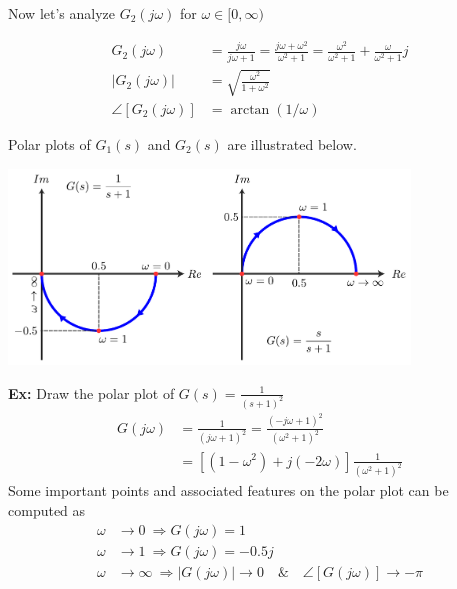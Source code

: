 \documentclass{article}
\begin{document}
Now let's analyze $G_2(j \omega)$ for $\omega \in [0 , \infty)$

\begin{align*}
 G_2(j \omega) &= \frac{j \omega}{j \omega +1} = \frac{j \omega + \omega^2}{\omega^2 +1} 
= \frac{\omega^2}{\omega^2 +1} + \frac{\omega}{\omega^2 +1} j
\\
| G_2(j \omega) | &= \sqrt{ \frac{ \omega^2 }{ 1 + \omega^2 } }
\\
\angle [ G_2(j \omega) ] &= \arctan (1 / \omega) 
\end{align*}

Polar plots of $G_1(s)$ and $G_2(s)$ are illustrated below. 

\vspace{6 pt}

  \begin{minipage}[h]{1\linewidth}
    \begin{center}
      \includegraphics[width=0.8\textwidth]{polar2}
    \end{center}
  \end{minipage}

\vspace{6 pt}

\textbf{Ex:} Draw the polar plot of  $G(s) = \frac{1}{(s+1)^2}$
%
\begin{align*}
  G(j \omega ) &= \frac{1}{ (j \omega + 1)^2 } = \frac{ (-j \omega + 1)^2 }{( \omega^2 +1 )^2 }
\\
&= \left[ \left( 1 - \omega^2 \right) + j ( - 2 \omega) \right] \frac{1}{( \omega^2 +1 )^2 }
\end{align*}
%
Some important points and associated features on the polar plot can be computed as
\begin{align*}
  \omega &\to 0 \ \Rightarrow G(j \omega) = 1
\\
 \omega &\to 1 \ \Rightarrow G(j \omega) = -0.5 j 
\\
 \omega &\to  \infty \ \Rightarrow | G(j \omega) | \to 0 \quad \& \quad \angle  [ G(j \omega) ] \to -\pi
\end{align*}
\end{document}
